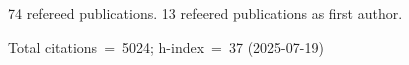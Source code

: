 74 refereed publications. 13 refeered publications as first author.

Total citations~=~5024; h-index~=~37 (2025-07-19)